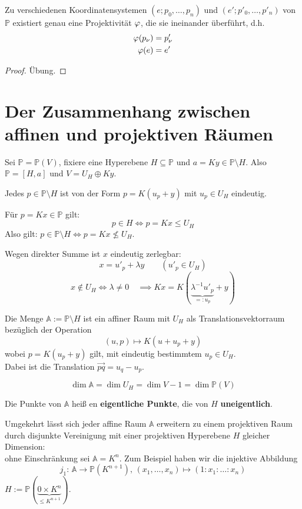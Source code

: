 \documentclass[parskip,a4paper,twoside,DIV15,BCOR12mm]{scrbook}
\begin{document}
\begin{theo}
\label{Satz 24.2}
Zu verschiedenen Koordinatensystemen \((e;p_{0},\ldots,p_{n})\) und
\((e';p'_{0},\ldots,p'_{n})\) von \(\mathbb{P}\) existiert genau eine 
Projektivität \(\varphi\), die sie ineinander überführt, d.h.
\begin{align*}
\varphi(p_{\nu})&=p'_{\nu}\\
\varphi(e)&=e'
\end{align*}
\end{theo}
\begin{proof}
\"Ubung.
\end{proof}
\section{Der Zusammenhang zwischen affinen und projektiven Räumen}
Sei \(\mathbb{P}=\mathbb{P}(V)\), fixiere eine Hyperebene 
\(H\subseteq\mathbb{P}\) und \(a=Ky\in\mathbb{P}\setminus H\). Also 
\(\mathbb{P}=[H,a]\) und \(V=U_{H}\oplus Ky\).
\begin{prerem}
Jedes \(p\in\mathbb{P}\setminus H\) ist von der Form \(p=K(u_{p}+y)\) mit
\(u_{p}\in U_{H}\) eindeutig.

Für \(p=Kx\in\mathbb{P}\) gilt:
\[
p\in H\Longleftrightarrow p=Kx\leq U_{H}
\]
Also gilt: \(p\in\mathbb{P}\setminus H\Longleftrightarrow p=Kx\not\leq U_{H}\).

Wegen direkter Summe ist \(x\) eindeutig zerlegbar:
\[
x=u'_{p}+\lambda y\qquad(u'_{p}\in U_{H})
\]
\[
x\not\in U_{H}\Longleftrightarrow\lambda\neq0\quad
    \implies Kx=K(\underbrace{\lambda^{-1}u'_{p}}_{=:u_{p}}+y)
\]
\end{prerem}
\begin{theo}
\label{Satz 24.3}
Die Menge \(\mathbb{A}:=\mathbb{P}\setminus H\) ist ein affiner Raum mit 
\(U_{H}\) als Translationsvektorraum bezüglich der Operation
\[
(u,p)\mapsto K(u+u_{p}+y)
\]
wobei \(p=K(u_{p}+y)\) gilt, mit eindeutig bestimmtem \(u_{p}\in U_{H}\).\\
Dabei ist die Translation \(\overrightarrow{pq}=u_{q}-u_{p}\).
\end{theo}
\begin{note}
\[
\dim\mathbb{A}=\dim U_{H}=\dim V-1=\dim\mathbb{P}(V)
\]
\end{note}
\begin{definition}
Die Punkte von \(\mathbb{A}\) heiß en \textbf{eigentliche Punkte}, die von
\(H\) \textbf{uneigentlich}.
\end{definition}
Umgekehrt lässt sich jeder affine Raum \(\mathbb{A}\) erweitern zu einem 
projektiven Raum durch disjunkte Vereinigung mit einer projektiven Hyperebene
\(H\) gleicher Dimension:\\
ohne Einschränkung sei \(\mathbb{A}=K^{n}\). Zum Beispiel haben wir die
injektive Abbildung
\[
j_{1}:\,\mathbb{A}\to\mathbb{P}(K^{n+1}),\,
    (x_{1},\ldots,x_{n})\mapsto(1:x_{1}:\ldots:x_{n})
\]
\(H:=\mathbb{P}(\underbrace{0\times K^{n}}_{\leq K^{n+1}})\).
\end{document}
